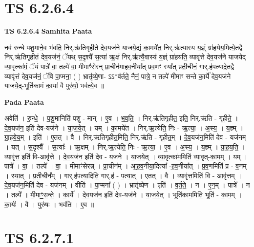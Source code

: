 \documentclass[17pt]{extarticle}
\begin{document}
\section*{ TS 6.2.6.4 }

\textbf{TS 6.2.6.4 } \newline
\textbf{Samhita Paata} \newline

नव॑ रुन्धे पशु॒माने॒व भ॑वति॒ निर्.ऋ॑तिगृहीते देव॒यज॑ने याजये॒द्यं का॒मये॑त॒ निर्.ऋ॑त्यास्य य॒ज्ञ्ं ग्रा॑हयेय॒मित्ये॒तद्वै निर्.ऋ॑तिगृहीतं देव॒यज॑नं॒ ॅयथ् स॒दृश्यै॑ स॒त्या॑ ऋ॒क्षं निर्.ऋ॑त्यै॒वास्य॑ य॒ज्ञ्ं ग्रा॑हयति॒ व्यावृ॑त्ते देव॒यज॑ने याजयेद् व्या॒वृत्का॑मं॒ ॅयं पात्रे॑ वा॒ तल्पे॑ वा॒ मीमाꣳ॑सेरन् प्रा॒चीन॑माहव॒नीया᳚त् प्रव॒णꣳ स्या᳚त् प्रती॒चीनं॒ गार्.ह॑पत्यादे॒तद्वै व्यावृ॑त्तं देव॒यज॑नं॒ ॅवि पा॒प्मना॒ ( ) भ्रातृ॑व्ये॒णा- ऽऽ*व॑र्तते॒ नैनं॒ पात्रे॒ न तल्पे॑ मीमाꣳ सन्ते का॒र्ये॑ देव॒यज॑ने याजये॒द्-भूति॑कामं का॒या॑ वै पुरु॑षो॒ भव॑त्ये॒व ॥ \newline

\textbf{Pada Paata} \newline

अवेति॑ । रु॒न्धे॒ । प॒शु॒मानिति॑ पशु - मान् । ए॒व । भ॒व॒ति॒ । निर्.ऋ॑तिगृहीत॒ इति॒ निर्.ऋ॑ति - गृ॒ही॒ते॒ । दे॒व॒यज॑न॒ इति॑ देव-यज॑ने । या॒ज॒ये॒त् । यम् । का॒मये॑त । निर्.ऋ॒त्येति॒ निः - ऋ॒त्या॒ । अ॒स्य॒ । य॒ज्ञ्म् । ग्रा॒ह॒ये॒य॒म् । इति॑ । ए॒तत् । वै । निर्.ऋ॑तिगृहीत॒मिति॒ निर्.ऋ॑ति - गृ॒ही॒त॒म् । दे॒व॒यज॑न॒मिति॑ देव - यज॑नम् । यत् । स॒दृश्यै᳚ । स॒त्याः᳚ । ऋ॒क्षम् । निर्.ऋ॒त्येति॒ निः - ऋ॒त्या॒ । ए॒व । अ॒स्य॒ । य॒ज्ञ्म् । ग्रा॒ह॒य॒ति॒ । व्यावृ॑त्त॒ इति॑ वि-आवृ॑त्ते । दे॒व॒यज॑न॒ इति॑ देव - यज॑ने । या॒ज॒ये॒त् । व्या॒वृत्का॑म॒मिति॑ व्या॒वृत्-का॒म॒म् । यम् । पात्रे᳚ । वा॒ । तल्पे᳚ । वा॒ । मीमाꣳ॑सेरन्न् । प्रा॒चीन᳚म् । आ॒ह॒व॒नीया॒दित्या᳚ -ह॒व॒नीया᳚त् । प्र॒व॒णमिति॑ प्र - व॒नम् । स्या॒त् । प्र॒ती॒चीन᳚म् । गार्.ह॑पत्या॒दिति॒ गार्.ह॑ - प॒त्या॒त् । ए॒तत् । वै । व्यावृ॑त्त॒मिति॑ वि - आवृ॑त्तम् । दे॒व॒यज॑न॒मिति॑ देव - यज॑नम् । वीति॑ । पा॒प्मना᳚ ( ) । भ्रातृ॑व्येण । एति॑ । व॒र्त॒ते॒ । न । ए॒न॒म् । पात्रे᳚ । न । तल्पे᳚ । मी॒माꣳ॒॒स॒न्ते॒ । का॒र्ये᳚ । दे॒व॒यज॑न॒ इति॑ देव-यज॑ने । या॒ज॒ये॒त् । भूति॑काम॒मिति॒ भूति॑ - का॒म॒म् । का॒र्यः॑ । वै । पुरु॑षः । भव॑ति । ए॒व ॥  \newline




\section*{ TS 6.2.7.1 }
\end{document}
